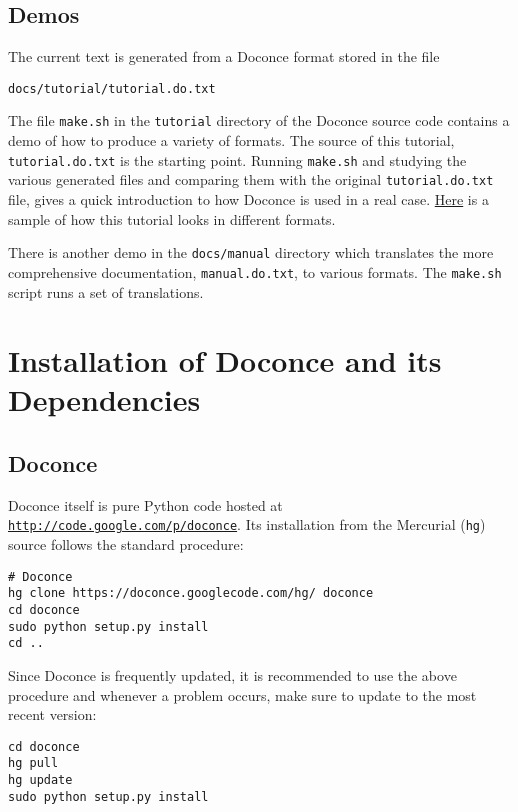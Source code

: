 \documentclass[twoside]{article}
\begin{document}
\subsection{Demos}

The current text is generated from a Doconce format stored in the file
\begin{Verbatim}[fontsize=\fontsize{9pt}{9pt},tabsize=8,baselinestretch=0.85,
fontfamily=tt,xleftmargin=7mm]
docs/tutorial/tutorial.do.txt
\end{Verbatim}
\noindent
The file {\fontsize{10pt}{10pt}\verb!make.sh!} in the {\fontsize{10pt}{10pt}\verb!tutorial!} directory of the
Doconce source code contains a demo of how to produce a variety of
formats.  The source of this tutorial, {\fontsize{10pt}{10pt}\verb!tutorial.do.txt!} is the
starting point.  Running {\fontsize{10pt}{10pt}\verb!make.sh!} and studying the various generated
files and comparing them with the original {\fontsize{10pt}{10pt}\verb!tutorial.do.txt!} file,
gives a quick introduction to how Doconce is used in a real case.
\href{{https://doconce.googlecode.com/hg/doc/demos/tutorial/index.html}}{Here}
is a sample of how this tutorial looks in different formats.

There is another demo in the {\fontsize{10pt}{10pt}\verb!docs/manual!} directory which
translates the more comprehensive documentation, {\fontsize{10pt}{10pt}\verb!manual.do.txt!}, to
various formats. The {\fontsize{10pt}{10pt}\verb!make.sh!} script runs a set of translations.


\section{Installation of Doconce and its Dependencies}

\subsection{Doconce}

Doconce itself is pure Python code hosted at \href{{http://code.google.com/p/doconce}}{\nolinkurl{http://code.google.com/p/doconce}}.  Its installation from the
Mercurial ({\fontsize{10pt}{10pt}\verb!hg!}) source follows the standard procedure:
\vspace{4pt}
\begin{Verbatim}[numbers=none,frame=lines,label=\fbox{{\tiny Terminal}},fontsize=\fontsize{9pt}{9pt},
labelposition=topline,framesep=2.5mm,framerule=0.7pt]
# Doconce
hg clone https://doconce.googlecode.com/hg/ doconce
cd doconce
sudo python setup.py install
cd ..
\end{Verbatim}
Since Doconce is frequently updated, it is recommended to use the
above procedure and whenever a problem occurs, make sure to
update to the most recent version:
\vspace{4pt}
\begin{Verbatim}[numbers=none,frame=lines,label=\fbox{{\tiny Terminal}},fontsize=\fontsize{9pt}{9pt},
labelposition=topline,framesep=2.5mm,framerule=0.7pt]
cd doconce
hg pull
hg update
sudo python setup.py install
\end{Verbatim}
\end{document}
